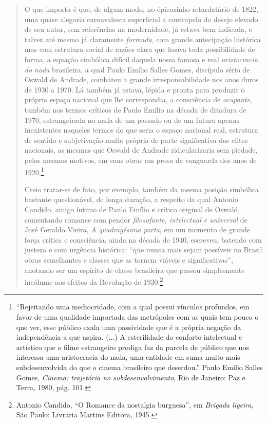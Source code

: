 \begin{quote}
O que importa é que, de algum modo, no épicozinho retardatário de 1822,
uma quase alegoria carnavalesca superficial a contrapelo do desejo
elevado de seu autor, sem referências na modernidade, já estava bem
indicada, e talvez até mesmo já claramente \emph{formada}, com grande
antecipação histórica mas com estrutura social de razões clara que
lesava toda possibilidade de forma, a equação simbólica difícil daquela
nossa famosa e real \emph{aristocracia do nada} brasileira, a qual Paulo
Emílio Salles Gomes, discípulo sério de Oswald de Andrade, combateu a
grande irresponsabilidade nos anos duros de 1930 a 1970. Lá também já
estava, lépida e pronta para produzir o próprio espaço nacional que lhe
correspondia, a consciência de \emph{ocupante}, também nos termos
críticos de Paulo Emílio na década de ditadura de 1970, estrangeirada no
nada de um passado ou de um futuro apenas inexistentes naqueles termos
do que seria o espaço nacional real, estrutura de sentido e subjetivação
muito própria de parte significativa das elites nacionais, as mesmas que
Oswald de Andrade ridicularizaria sem piedade, pelos mesmos motivos, em
suas obras em prosa de vanguarda dos anos de 1920.\footnote{``Rejeitando
  uma mediocridade, com a qual possui vínculos profundos, em favor de
  uma qualidade importada das metrópoles com as quais tem pouco o que
  ver, esse público exala uma passividade que é a própria negação da
  independência a que aspira. (...) A esterilidade do conforto
  intelectual e artístico que o filme estrangeiro prodiga faz da parcela
  de público que nos interessa uma aristocracia do nada, uma entidade em
  suma muito mais subdesenvolvida do que o cinema brasileiro que
  deserdou.'' Paulo Emílio Salles Gomes, \emph{Cinema: trajetória no
  subdesenvolvimento}, Rio de Janeiro: Paz e Terra, 1980, pág. 101.}

Creio tratar-se de fato, por exemplo, também da mesma posição simbólica
bastante questionável, de longa duração, a respeito da qual Antonio
Candido, amigo íntimo de Paulo Emílio e crítico original de Oswald,
comentando romance com pendor \emph{filosofante, intelectual e
universal} de José Geraldo Vieira, \emph{A quadragésima porta}, em um
momento de grande força crítica e consciência, ainda na década de 1940,
escreveu, batendo com justeza e com urgência histórica: ``que nunca mais
sejam possíveis no Brasil obras semelhantes e classes que as tornem
viáveis e significativas'', anotando ser um espírito de classe
brasileira que passou simplesmente incólume aos efeitos da Revolução de
1930.\footnote{Antonio Candido, ``O Romance da nostalgia burguesa'', em
  \emph{Brigada ligeira}, São Paulo: Livraria Martins Editora, 1945.}


\end{quote}
